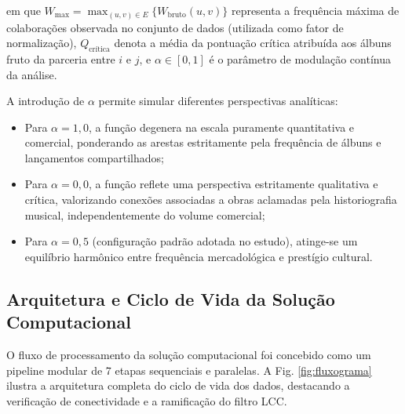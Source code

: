 \documentclass[conference]{IEEEtran}
\begin{document}
em que $W_{\max} = \max_{(u,v) \in E} \{ W_{\text{bruto}}(u,v) \}$ representa a frequência máxima de colaborações observada no conjunto de dados (utilizada como fator de normalização), $Q_{\text{crítica}}$ denota a média da pontuação crítica atribuída aos álbuns fruto da parceria entre $i$ e $j$, e $\alpha \in [0, 1]$ é o parâmetro de modulação contínua da análise.

A introdução de $\alpha$ permite simular diferentes perspectivas analíticas:
\begin{itemize}
    \item Para $\alpha = 1,0$, a função degenera na escala puramente quantitativa e comercial, ponderando as arestas estritamente pela frequência de álbuns e lançamentos compartilhados;
    \item Para $\alpha = 0,0$, a função reflete uma perspectiva estritamente qualitativa e crítica, valorizando conexões associadas a obras aclamadas pela historiografia musical, independentemente do volume comercial;
    \item Para $\alpha = 0,5$ (configuração padrão adotada no estudo), atinge-se um equilíbrio harmônico entre frequência mercadológica e prestígio cultural.
\end{itemize}

\subsection{Arquitetura e Ciclo de Vida da Solução Computacional}
O fluxo de processamento da solução computacional foi concebido como um pipeline modular de 7 etapas sequenciais e paralelas. A Fig. \ref{fig:fluxograma} ilustra a arquitetura completa do ciclo de vida dos dados, destacando a verificação de conectividade e a ramificação do filtro LCC.
\end{document}
